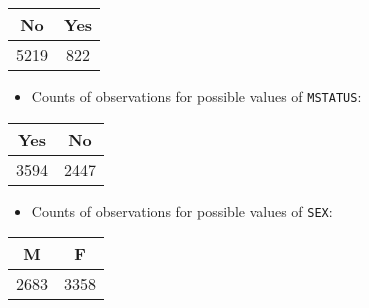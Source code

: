 \documentclass[]{article}
\providecommand{\tightlist}{%
  \setlength{\itemsep}{0pt}\setlength{\parskip}{0pt}}
\begin{document}
\begin{longtable}[]{@{}cc@{}}
\toprule
\begin{minipage}[b]{0.09\columnwidth}\centering\strut
No\strut
\end{minipage} & \begin{minipage}[b]{0.09\columnwidth}\centering\strut
Yes\strut
\end{minipage}\tabularnewline
\midrule
\endhead
\begin{minipage}[t]{0.09\columnwidth}\centering\strut
5219\strut
\end{minipage} & \begin{minipage}[t]{0.09\columnwidth}\centering\strut
822\strut
\end{minipage}\tabularnewline
\bottomrule
\end{longtable}

\begin{itemize}
\tightlist
\item
  Counts of observations for possible values of \texttt{MSTATUS}:
\end{itemize}

\begin{longtable}[]{@{}cc@{}}
\toprule
\begin{minipage}[b]{0.09\columnwidth}\centering\strut
Yes\strut
\end{minipage} & \begin{minipage}[b]{0.09\columnwidth}\centering\strut
No\strut
\end{minipage}\tabularnewline
\midrule
\endhead
\begin{minipage}[t]{0.09\columnwidth}\centering\strut
3594\strut
\end{minipage} & \begin{minipage}[t]{0.09\columnwidth}\centering\strut
2447\strut
\end{minipage}\tabularnewline
\bottomrule
\end{longtable}

\begin{itemize}
\tightlist
\item
  Counts of observations for possible values of \texttt{SEX}:
\end{itemize}

\begin{longtable}[]{@{}cc@{}}
\toprule
\begin{minipage}[b]{0.09\columnwidth}\centering\strut
M\strut
\end{minipage} & \begin{minipage}[b]{0.09\columnwidth}\centering\strut
F\strut
\end{minipage}\tabularnewline
\midrule
\endhead
\begin{minipage}[t]{0.09\columnwidth}\centering\strut
2683\strut
\end{minipage} & \begin{minipage}[t]{0.09\columnwidth}\centering\strut
3358\strut
\end{minipage}\tabularnewline
\bottomrule
\end{longtable}
\end{document}
